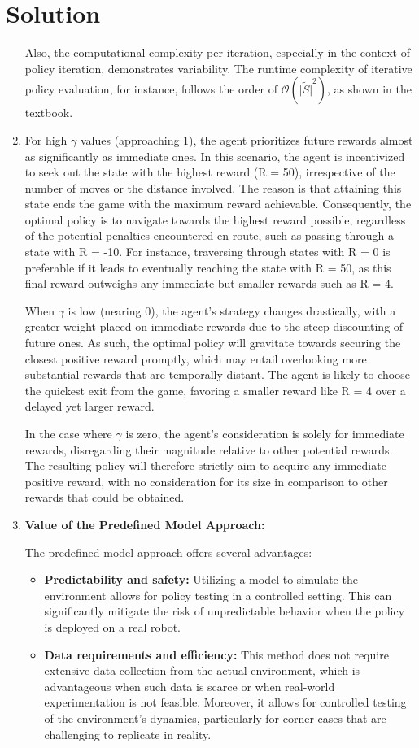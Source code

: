 \documentclass[submit]{harvardml}
\newenvironment{solution}
  {\color{blue}\section*{Solution}}
{}
\begin{document}
\begin{solution}
\begin{enumerate}
Also, the computational complexity per iteration, especially in the context of policy iteration, demonstrates variability. The runtime complexity of iterative policy evaluation, for instance, follows the order of $\mathcal{O}(\tilde{|S|}^2)$, as shown in the textbook.

\item For high $\gamma$ values (approaching 1), the agent prioritizes future rewards almost as significantly as immediate ones. In this scenario, the agent is incentivized to seek out the state with the highest reward (R = 50), irrespective of the number of moves or the distance involved. The reason is that attaining this state ends the game with the maximum reward achievable. Consequently, the optimal policy is to navigate towards the highest reward possible, regardless of the potential penalties encountered en route, such as passing through a state with R = -10. For instance, traversing through states with R = 0 is preferable if it leads to eventually reaching the state with R = 50, as this final reward outweighs any immediate but smaller rewards such as R = 4.

When $\gamma$ is low (nearing 0), the agent's strategy changes drastically, with a greater weight placed on immediate rewards due to the steep discounting of future ones. As such, the optimal policy will gravitate towards securing the closest positive reward promptly, which may entail overlooking more substantial rewards that are temporally distant. The agent is likely to choose the quickest exit from the game, favoring a smaller reward like R = 4 over a delayed yet larger reward.

In the case where $\gamma$ is zero, the agent's consideration is solely for immediate rewards, disregarding their magnitude relative to other potential rewards. The resulting policy will therefore strictly aim to acquire any immediate positive reward, with no consideration for its size in comparison to other rewards that could be obtained.

\item \textbf{Value of the Predefined Model Approach:}

The predefined model approach offers several advantages:
\begin{itemize}
    \item \textbf{Predictability and safety:} Utilizing a model to simulate the environment allows for policy testing in a controlled setting. This can significantly mitigate the risk of unpredictable behavior when the policy is deployed on a real robot.
    \item \textbf{Data requirements and efficiency:} This method does not require extensive data collection from the actual environment, which is advantageous when such data is scarce or when real-world experimentation is not feasible. Moreover, it allows for controlled testing of the environment's dynamics, particularly for corner cases that are challenging to replicate in reality.
\end{itemize}


\end{enumerate}
\end{solution}
\end{document}
